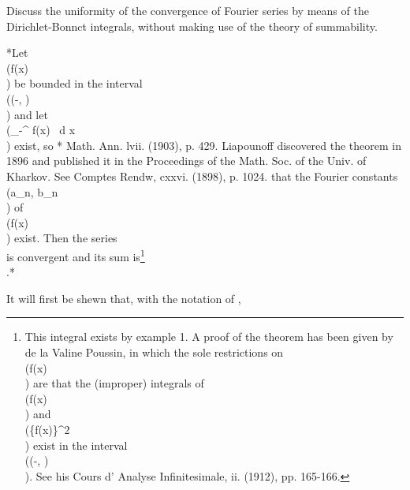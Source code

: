 \begin{wandwexample}
  Discuss the uniformity of the convergence of Fourier series
  by means of the Dirichlet-Bonnct integrals, without making use of the
  theory of summability.
\end{wandwexample}
%
*Let \\(f(x)\\) be bounded in the interval \\((-\pi, \pi)\\) and let
\\(\int_{-\pi}^{\pi} f(x) \, d x\\) exist, so
* Math. Ann. lvii. (1903), p. 429. Liapounoff discovered the theorem
in 1896 and published it in the Proceedings of the Math. Soc. of the
Univ. of Kharkov. See Comptes Rendw, cxxvi. (1898), p. 1024.
%
%
that the Fourier constants \\(a_{n}, b_{n}\\) of \\(f(x)\\) exist. Then the series
\\[ 
\frac{1}{2} a_{0}^{2}
+
\sum_{n=1}^{\infty} \left(
  a_{n}^{2} + b_{n}^{2}
\right)
\\] 
is convergent and its sum is\footnote{This integral exists by
   example 1. %
  A proof of the theorem has been given by de la Valine Poussin, %
  in which the sole restrictions on \\(f(x)\\) are that the (improper) integrals of
  \\(f(x)\\) and \\(\left\{f(x)\right\}^{2}\\) exist in the interval \\((-\pi, \pi)\\). See his
  Cours d' Analyse Infinitesimale, ii. (1912), pp. 165-166.}
\\[ 
\frac{1}{\pi}
\! \int_{-\pi}^{\pi}\!
\left\{
  f(x)
\right\}^{2}
\, d x.
\\].*

It will first be shewn that, with the notation of ,
\\[ 
\lim_{m \rightarrow \infty}
\int_{-\pi}^{\pi}\!
\left\{
  f(x)
  -
  \frac{1}{m}
  \sum_{n=0}^{m-1}
  S_{n}(x)
\right\}^{2}
\, d x
=
0.
\\] 

